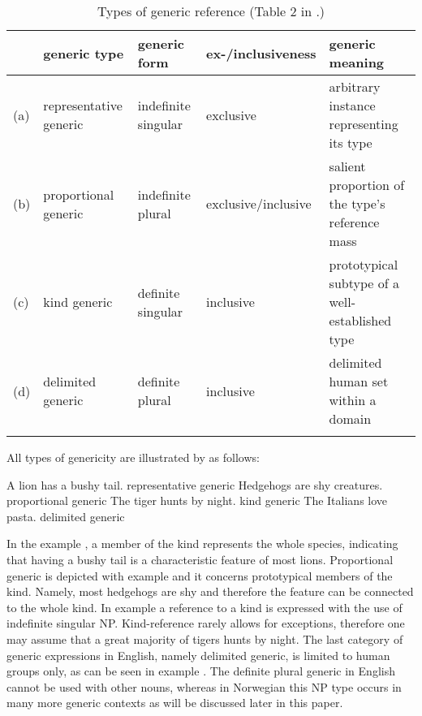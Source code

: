 \documentclass[output=paper]{langsci/langscibook}
\begin{document}
\begin{table}
\footnotesize
\caption{Types of generic reference (Table 2 in \citealt[224]{Radden2009}.)\label{tab:Radden2009}}
\begin{tabularx}{\textwidth}{ lll >{\raggedright}p{} Q }
\lsptoprule                                                               
    & generic type            & generic form        & ex-/inclu\-siveness    & generic meaning \\\midrule
(a) & representative generic  & indefinite singular & exclusive            & arbitrary instance  representing its type\\\tablevspace
(b) & proportional generic    & indefinite plural   & exclusive\slash inclusive  & salient proportion of the    type’s reference mass\\\tablevspace
(c) & kind generic            & definite singular   & inclusive            & prototypical subtype of  a well-established type\\\tablevspace
(d) & delimited generic       & definite plural     & inclusive            & delimited human set  within a domain\\
\lspbottomrule
\end{tabularx}
\end{table}

All types of genericity are illustrated by \citet[224]{Radden2009} as follows:

\begin{exe}
    \ex A lion has a bushy tail. \hfill{representative generic} \label{ex:lion1}
    \ex Hedgehogs are shy creatures. \hfill{proportional generic} \label{ex:hedgehog2}
    \ex The tiger hunts by night. \hfill{kind generic} \label{ex:tiger3}
    \ex The Italians love pasta. \hfill{delimited generic} \label{ex:italians4}
\end{exe}

\noindent In the example , a member of the kind represents the whole species, indicating that having a bushy tail is a characteristic feature of most lions. Proportional generic is depicted with example  and it concerns prototypical members of the kind. Namely, most hedgehogs are shy and therefore the feature can be connected to the whole kind. In example  a reference to a kind is expressed with the use of indefinite singular NP. Kind-reference rarely allows for exceptions, therefore one may assume that a great majority of tigers hunts by night. The last category of generic expressions in English, namely delimited generic, is limited to human groups only, as can be seen in example . The definite plural generic in English cannot be used with other nouns, whereas in Norwegian this NP type occurs in many more generic contexts as will be discussed later in this paper.
\end{document}

